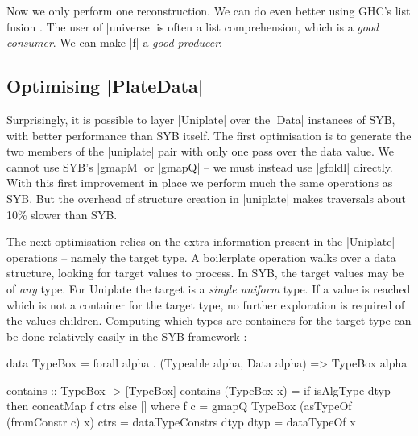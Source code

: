 Now we only perform one reconstruction. We can do even better using GHC's list fusion \cite{spj:rules}. The user of |universe| is often a list comprehension, which is a \textit{good consumer}. We can make |f| a \textit{good producer}:


\subsection{Optimising |PlateData|}
\label{secU:optimise_playdata}

Surprisingly, it is possible to layer |Uniplate| over the |Data| instances of SYB, with better performance than SYB itself. The first optimisation is to generate the two members of the |uniplate| pair with only one pass over the data value. We cannot use SYB's |gmapM| or |gmapQ| -- we must instead use |gfoldl| directly. With this first improvement in place we perform much the same operations as SYB. But the overhead of structure creation in |uniplate| makes traversals about 10\% slower than SYB.

The next optimisation relies on the extra information present in the |Uniplate| operations -- namely the target type. A boilerplate operation walks over a data structure, looking for target values to process. In SYB, the target values may be of \textit{any} type. For Uniplate the target is a \textit{single uniform} type. If a value is reached which is not a container for the target type, no further exploration is required of the values children. Computing which types are containers for the target type can be done relatively easily in the SYB framework \citep{lammel:syb2}:

\begin{onepage}
\begin{code}
data TypeBox = forall alpha . (Typeable alpha, Data alpha) => TypeBox alpha

contains :: TypeBox -> [TypeBox]
contains (TypeBox x) = if isAlgType dtyp then concatMap f ctrs else []
    where
        f c = gmapQ TypeBox (asTypeOf (fromConstr c) x)
        ctrs = dataTypeConstrs dtyp
        dtyp = dataTypeOf x
\end{code}
\end{onepage}

